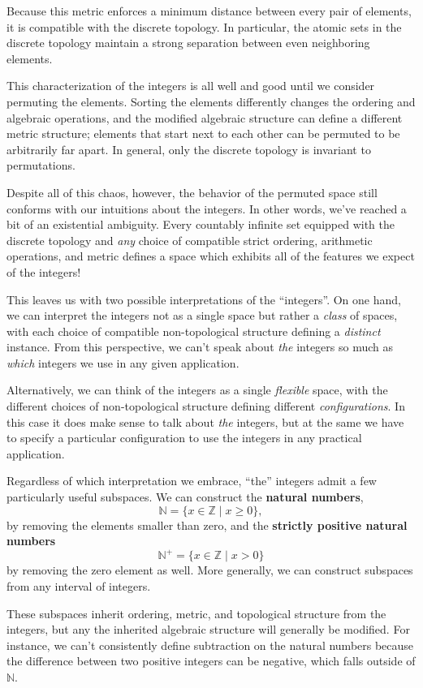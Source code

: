 \documentclass[
  letterpaper,
  DIV=11,
  numbers=noendperiod]{scrartcl}
\begin{document}
Because this metric enforces a minimum distance between every pair of
elements, it is compatible with the discrete topology. In particular,
the atomic sets in the discrete topology maintain a strong separation
between even neighboring elements.

This characterization of the integers is all well and good until we
consider permuting the elements. Sorting the elements differently
changes the ordering and algebraic operations, and the modified
algebraic structure can define a different metric structure; elements
that start next to each other can be permuted to be arbitrarily far
apart. In general, only the discrete topology is invariant to
permutations.

Despite all of this chaos, however, the behavior of the permuted space
still conforms with our intuitions about the integers. In other words,
we've reached a bit of an existential ambiguity. Every countably
infinite set equipped with the discrete topology and \emph{any} choice
of compatible strict ordering, arithmetic operations, and metric defines
a space which exhibits all of the features we expect of the integers!

This leaves us with two possible interpretations of the ``integers''. On
one hand, we can interpret the integers not as a single space but rather
a \emph{class} of spaces, with each choice of compatible non-topological
structure defining a \emph{distinct} instance. From this perspective, we
can't speak about \emph{the} integers so much as \emph{which} integers
we use in any given application.

Alternatively, we can think of the integers as a single \emph{flexible}
space, with the different choices of non-topological structure defining
different \emph{configurations}. In this case it does make sense to talk
about \emph{the} integers, but at the same we have to specify a
particular configuration to use the integers in any practical
application.

Regardless of which interpretation we embrace, ``the'' integers admit a
few particularly useful subspaces. We can construct the \textbf{natural
numbers}, \[
\mathbb{N} = \{ x \in \mathbb{Z} \mid x \ge 0 \},
\] by removing the elements smaller than zero, and the \textbf{strictly
positive natural numbers} \[
\mathbb{N}^{+} = \{ x \in \mathbb{Z} \mid x > 0 \}
\] by removing the zero element as well. More generally, we can
construct subspaces from any interval of integers.

These subspaces inherit ordering, metric, and topological structure from
the integers, but any the inherited algebraic structure will generally
be modified. For instance, we can't consistently define subtraction on
the natural numbers because the difference between two positive integers
can be negative, which falls outside of \(\mathbb{N}\).
\end{document}
